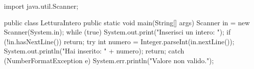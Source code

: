 \begin{unipdcode}[language=Java]
import java.util.Scanner;

public class LetturaIntero {
    public static void main(String[] args) {
        Scanner in = new Scanner(System.in);
        while (true) {
            System.out.print("Inserisci un intero: ");
            if (!in.hasNextLine()) return;
            try {
                int numero = Integer.parseInt(in.nextLine());
                System.out.println("Hai inserito: " + numero);
                return;
            } catch (NumberFormatException e) {
                System.err.println("Valore non valido.");
            }
        }
    }
}
\end{unipdcode}

